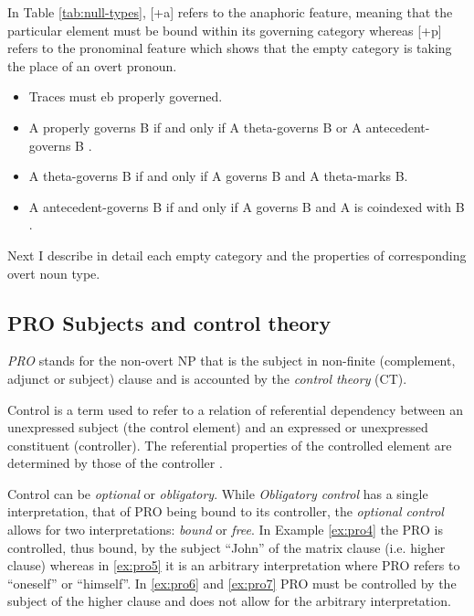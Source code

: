In Table \ref{tab:null-types}, [+a] refers to the anaphoric feature, meaning that the particular element must be bound within its governing category whereas [+p] refers to the pronominal feature which shows that the empty category is taking the place of an overt pronoun.


\begin{definition}\label{def:ecp}
    \leavevmode
    \makeatletter
    \@nobreaktrue
    \makeatother
    \begin{itemize}
        \item Traces must eb properly governed.
        \item A properly governs B if and only if A theta-governs B or A antecedent-governs B \citep[17]{Chomsky1986}.
        \item A theta-governs B if and only if  A governs B and A theta-marks B.
        \item A antecedent-governs B if and only if A governs B and A is coindexed with B \citep[442]{Haegeman1991}.
    \end{itemize}
\end{definition}



Next I describe in detail each empty category and the properties of corresponding overt noun type. 


\subsection{PRO Subjects and control theory}
\label{sec:pro-mcg}
\textit{PRO} stands for the non-overt NP that is the subject in non-finite (complement, adjunct or subject) clause and is accounted by the \textit{control theory} (CT).

\begin{definition}[Control]\label{def:control}
	Control is a term used to refer to a relation of referential dependency between an unexpressed subject (the control element) and an expressed or unexpressed constituent (controller). The referential properties of the controlled element are determined by those of the controller \citep{Bresnan1982}.
\end{definition}

Control can be \textit{optional} or \textit{obligatory}. While \textit{Obligatory control} has a single interpretation, that of PRO being bound to its controller, the \textit{optional control} allows for two interpretations: \textit{bound} or \textit{free}. In Example \ref{ex:pro4} the PRO is controlled, thus bound, by the subject ``John'' of the matrix clause (i.e. higher clause) whereas in \ref{ex:pro5} it is an arbitrary interpretation where PRO refers to ``oneself'' or ``himself''. In \ref{ex:pro6} and \ref{ex:pro7} PRO must be controlled by the subject of the higher clause and does not allow for the arbitrary interpretation.

